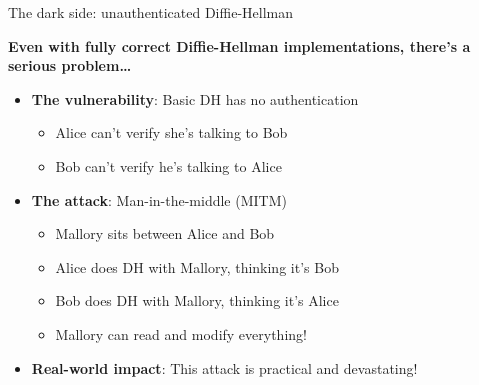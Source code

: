 \ifdefined\PRESENTATION\else\PassOptionsToClass{handout}{beamer}\fi\documentclass[aspectratio=169, lualatex]{beamer}
\begin{document}
\begin{frame}{The dark side: unauthenticated Diffie-Hellman}
	\begin{center}
		\Large\textbf{Even with fully correct Diffie-Hellman implementations, there's a serious problem\ldots}
	\end{center}
	\vspace{0.5cm}
	\begin{itemize}[<+->]
		\item \textbf{The vulnerability}: Basic DH has no authentication
		      \begin{itemize}
			      \item Alice can't verify she's talking to Bob
			      \item Bob can't verify he's talking to Alice
		      \end{itemize}
		\item \textbf{The attack}: Man-in-the-middle (MITM)
		      \begin{itemize}
			      \item Mallory sits between Alice and Bob
			      \item Alice does DH with Mallory, thinking it's Bob
			      \item Bob does DH with Mallory, thinking it's Alice
			      \item Mallory can read and modify everything!
		      \end{itemize}
		\item \textbf{Real-world impact}: This attack is practical and devastating!
	\end{itemize}
\end{frame}
\end{document}
